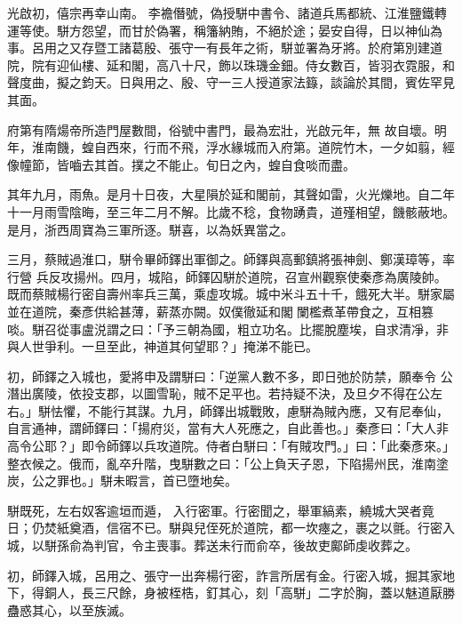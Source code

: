 \begin{pinyinscope}
 光啟初，僖宗再幸山南。
 李襜僭號，偽授駢中書令、諸道兵馬都統、江淮鹽鐵轉運等使。駢方怨望，而甘於偽署，稱籓納賄，不絕於途；晏安自得，日以神仙為事。呂用之又存暨工諸葛殷、張守一有長年之術，駢並署為牙將。於府第別建道院，院有迎仙樓、延和閣，高八十尺，飾以珠璣金鈿。侍女數百，皆羽衣霓服，和聲度曲，擬之鈞天。日與用之、殷、守一三人授道家法籙，談論於其間，賓佐罕見其面。



 府第有隋煬帝所造門屋數間，俗號中書門，最為宏壯，光啟元年，無
 故自壞。明年，淮南饑，蝗自西來，行而不飛，浮水緣城而入府第。道院竹木，一夕如翦，經像幢節，皆嚙去其首。撲之不能止。旬日之內，蝗自食啖而盡。



 其年九月，雨魚。是月十日夜，大星隕於延和閣前，其聲如雷，火光爍地。自二年十一月雨雪陰晦，至三年二月不解。比歲不稔，食物踴貴，道殣相望，饑骸蔽地。是月，浙西周寶為三軍所逐。駢喜，以為妖異當之。



 三月，蔡賊過淮口，駢令畢師鐸出軍御之。師鐸與高郵鎮將張神劍、鄭漢璋等，率行營
 兵反攻揚州。四月，城陷，師鐸囚駢於道院，召宣州觀察使秦彥為廣陵帥。既而蔡賊楊行密自壽州率兵三萬，乘虛攻城。城中米斗五十千，餓死大半。駢家屬並在道院，秦彥供給甚薄，薪蒸亦闕。奴僕徹延和閣闌檻煮革帶食之，互相篡啖。駢召從事盧涚謂之曰：「予三朝為國，粗立功名。比擺脫塵埃，自求清凈，非與人世爭利。一旦至此，神道其何望耶？」掩涕不能已。



 初，師鐸之入城也，愛將申及謂駢曰：「逆黨人數不多，即日弛於防禁，願奉令
 公潛出廣陵，依投支郡，以圖雪恥，賊不足平也。若持疑不決，及旦夕不得在公左右。」駢怯懼，不能行其謀。九月，師鐸出城戰敗，慮駢為賊內應，又有尼奉仙，自言通神，謂師鐸曰：「揚府災，當有大人死應之，自此善也。」秦彥曰：「大人非高令公耶？」即令師鐸以兵攻道院。侍者白駢曰：「有賊攻門。」曰：「此秦彥來。」整衣候之。俄而，亂卒升階，曳駢數之曰：「公上負天子恩，下陷揚州民，淮南塗炭，公之罪也。」駢未暇言，首已墮地矣。



 駢既死，左右奴客逾垣而遁，
 入行密軍。行密聞之，舉軍縞素，繞城大哭者竟日；仍焚紙奠酒，信宿不已。駢與兒侄死於道院，都一坎瘞之，裹之以氈。行密入城，以駢孫俞為判官，令主喪事。葬送未行而俞卒，後故吏鄺師虔收葬之。



 初，師鐸入城，呂用之、張守一出奔楊行密，詐言所居有金。行密入城，掘其家地下，得銅人，長三尺餘，身被桎梏，釘其心，刻「高駢」二字於胸，蓋以魅道厭勝蠱惑其心，以至族滅。




\end{pinyinscope}
